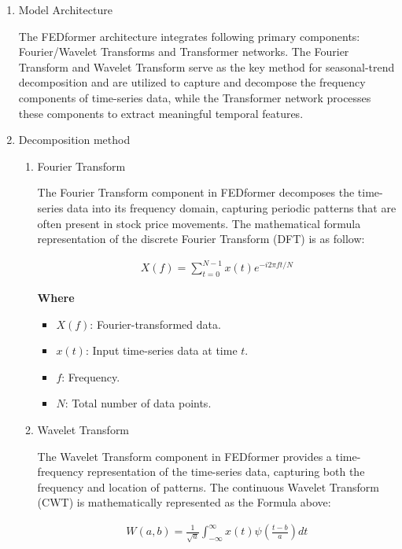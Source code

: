 \documentclass[conference]{IEEEtran}
\begin{document}
\begin{enumerate}
    \item Model Architecture

    The FEDformer architecture integrates following primary components: Fourier/Wavelet Transforms and Transformer networks. The Fourier Transform and Wavelet Transform serve as the key method for seasonal-trend decomposition and are utilized to capture and decompose the frequency components of time-series data, while the Transformer network processes these components to extract meaningful temporal features.

    \item Decomposition method
    \begin{enumerate}
        \item Fourier Transform

        The Fourier Transform component in FEDformer decomposes the time-series data into its frequency domain, capturing periodic patterns that are often present in stock price movements. The mathematical formula representation of the discrete Fourier Transform (DFT) is as follow:

        \begin{align*}
            X(f) = \sum_{t=0}^{N-1} x(t) e^{-i 2 \pi f t / N}
        \end{align*}

        \textbf{Where}
        \begin{itemize}
            \item $X(f)$: Fourier-transformed data.
            \item $x(t)$: Input time-series data at time $t$.
            \item $f$: Frequency.
            \item $N$: Total number of data points.
        \end{itemize}

        \item Wavelet Transform

        The Wavelet Transform component in FEDformer provides a time-frequency representation of the time-series data, capturing both the frequency and location of patterns. The continuous Wavelet Transform (CWT) is mathematically represented as the Formula above:

        \begin{align*}
            W(a, b) = \frac{1}{\sqrt{a}} \int_{-\infty}^{\infty} x(t) \psi \left( \frac{t-b}{a} \right) dt
        \end{align*}


\end{enumerate}
\end{enumerate}
\end{document}
